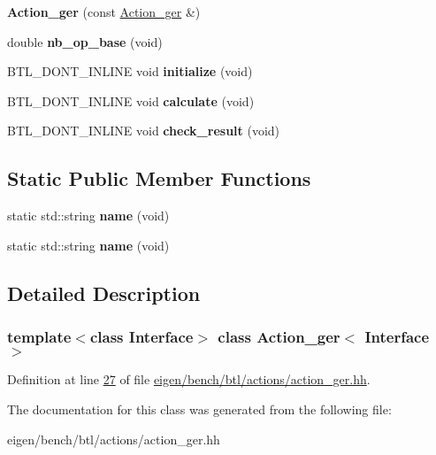 \begin{DoxyCompactItemize}
{\bfseries Action\+\_\+ger} (const \hyperlink{class_action__ger}{Action\+\_\+ger} \&)
\item 
\mbox{\label{class_action__ger_ad351bc01c2ef5eb1e4f37c44ecc5e4ae}} 
double {\bfseries nb\+\_\+op\+\_\+base} (void)
\item 
\mbox{\label{class_action__ger_a02cbbf9d4b4717aaaae0742319dedcf4}} 
B\+T\+L\+\_\+\+D\+O\+N\+T\+\_\+\+I\+N\+L\+I\+NE void {\bfseries initialize} (void)
\item 
\mbox{\label{class_action__ger_a5353c98d7cd5cb72b56eb3fe9b6e1e42}} 
B\+T\+L\+\_\+\+D\+O\+N\+T\+\_\+\+I\+N\+L\+I\+NE void {\bfseries calculate} (void)
\item 
\mbox{\label{class_action__ger_a52e73e2092e37993abcdc50fd2e99444}} 
B\+T\+L\+\_\+\+D\+O\+N\+T\+\_\+\+I\+N\+L\+I\+NE void {\bfseries check\+\_\+result} (void)
\end{DoxyCompactItemize}
\subsection*{Static Public Member Functions}
\begin{DoxyCompactItemize}
\item 
\mbox{\label{class_action__ger_af6b7313f814198910cfbe9658c2ff12c}} 
static std\+::string {\bfseries name} (void)
\item 
\mbox{\label{class_action__ger_af6b7313f814198910cfbe9658c2ff12c}} 
static std\+::string {\bfseries name} (void)
\end{DoxyCompactItemize}


\subsection{Detailed Description}
\subsubsection*{template$<$class Interface$>$\newline
class Action\+\_\+ger$<$ Interface $>$}



Definition at line \hyperlink{eigen_2bench_2btl_2actions_2action__ger_8hh_source_l00027}{27} of file \hyperlink{eigen_2bench_2btl_2actions_2action__ger_8hh_source}{eigen/bench/btl/actions/action\+\_\+ger.\+hh}.



The documentation for this class was generated from the following file\+:\begin{DoxyCompactItemize}
\item 
eigen/bench/btl/actions/action\+\_\+ger.\+hh\end{DoxyCompactItemize}
